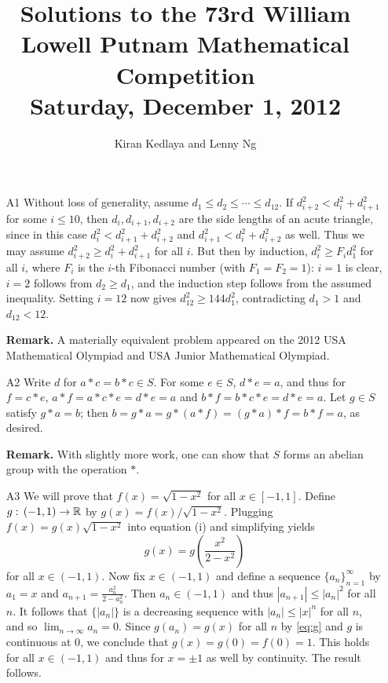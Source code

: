 \documentclass[amssymb,twocolumn,pra,10pt,aps]{revtex4-1}
\begin{document}
\title{Solutions to the 73rd William Lowell Putnam Mathematical Competition \\
    Saturday, December 1, 2012}
\author{Kiran Kedlaya and Lenny Ng}
\noaffiliation
\maketitle

\begin{itemize}

\item[A1]
Without loss of generality, assume $d_1\leq d_2\leq \cdots \leq d_{12}$.
If $d_{i+2}^2 < d_i^2+d_{i+1}^2$ for some $i\leq 10$, then
$d_i,d_{i+1},d_{i+2}$ are the side lengths of an acute triangle, since
in this case $d_i^2 < d_{i+1}^2+d_{i+2}^2$ and $d_{i+1}^2 <
d_i^2+d_{i+2}^2$ as well. Thus we may assume $d_{i+2}^2 \geq d_i^2 +
d_{i+1}^2$ for all $i$. But then by induction, $d_i^2 \geq F_i d_1^2$
for all $i$, where $F_i$ is the $i$-th Fibonacci number (with
$F_1=F_2=1$): $i=1$ is clear, $i=2$ follows from $d_2\geq d_1$, and the
induction step follows from the assumed inequality. Setting $i=12$ now
gives $d_{12}^2 \geq 144 d_1^2$, contradicting $d_1>1$ and $d_{12}<12$.

\noindent
\textbf{Remark.} A materially equivalent problem appeared on the 2012
USA Mathematical Olympiad and USA Junior Mathematical Olympiad.

\item[A2]
Write $d$ for $a * c = b * c \in S$. For some $e\in S$, $d * e = a$, and
thus for $f = c * e$, $a * f = a * c * e = d * e = a$ and $b * f = b * c
* e = d * e = a$. Let $g \in S$ satisfy $g * a = b$; then $b = g * a = g
* (a * f) = (g * a) * f = b * f = a$, as desired.

\noindent
\textbf{Remark.} With slightly more work, one can show that $S$ forms an abelian group
with the operation $*$.

\item[A3]
We will prove that $f(x) = \sqrt{1-x^2}$ for all $x \in [-1,1]$. Define
$g :\thinspace (-1,1) \to \mathbb{R}$ by
$g(x) = f(x)/\sqrt{1-x^2}$. Plugging $f(x) = g(x)\sqrt{1-x^2}$ into
equation (i) and simplifying yields
\begin{equation} \label{eq:g}
g(x) = g\left(\frac{x^2}{2-x^2}\right)
\end{equation}
  for all $x \in (-1,1)$. Now fix $x \in (-1,1)$ and define a sequence
$\{a_n\}_{n=1}^\infty$ by $a_1=x$ and $a_{n+1} = \frac{a_n^2}{2-a_n^2}$.
Then
  $a_n \in (-1,1)$ and thus $|a_{n+1}| \leq |a_n|^2$ for all $n$. It
follows that $\{|a_n|\}$ is a decreasing sequence with $|a_n| \leq
|x|^n$ for all $n$, and so $\lim_{n\to\infty} a_n = 0$. Since $g(a_n) =
g(x)$ for all $n$ by \eqref{eq:g} and $g$ is continuous at $0$, we
conclude that $g(x) = g(0) = f(0) = 1$. This holds for all $x \in
(-1,1)$ and thus for $x=\pm 1$ as well by continuity. The result follows.


\end{itemize}
\end{document}
